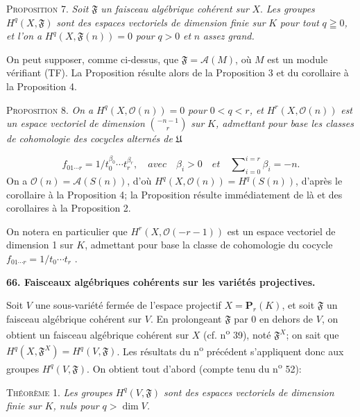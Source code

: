 \textsc{Proposition} 7. \textit{Soit} $\mathfrak{F}$ \textit{un faisceau algébrique cohérent sur} $X$. \textit{Les groupes} $H^q(X, \mathfrak{F})$ \textit{sont des espaces vectoriels de dimension finie sur} $K$ \textit{pour tout} $q \geqq 0$\textit{, et l'on a} $H^q(X, \mathfrak{F}(n)) = 0$ \textit{pour} $q > 0$ \textit{et} $n$ \textit{assez grand.}

On peut supposer, comme ci-dessus, que $\mathfrak{F} = \mathcal{A}(M)$, où $M$ est un module vérifiant (TF). La Proposition résulte alors de la Proposition 3 et du corollaire à la Proposition 4.

\textsc{Proposition} 8. \textit{On a} $H^q(X, \mathcal{O}(n)) = 0$ \textit{pour} $0 < q < r$\textit{, et} $H^r(X, \mathcal{O}(n))$ \textit{est un espace vectoriel de dimension} $\binom{-n-1}{r}$ \textit{sur} $K$\textit{, admettant pour base les classes}
\textit{de cohomologie des cocycles alternés de} $\mathfrak{U}$

\begin{equation*}
f_{01\cdots r} = 1/t_0^{\beta_0} \cdots t_r^{\beta_r}, \quad \mathit{avec} \quad \beta_i > 0 \quad \mathit{et} \quad \sum\nolimits_{i=0}^{i=r} \beta_i = -n.
\end{equation*}
On a $\mathcal{O}(n) = \mathcal{A}(S(n))$, d'où $H^q(X, \mathcal{O}(n)) = H^q(S(n))$, d'après le corollaire à la Proposition 4; la Proposition résulte immédiatement de là et des corollaires à la Proposition 2.

On notera en particulier que $H^r(X, \mathcal{O}(-r - 1))$ est un espace vectoriel de dimension 1 sur $K$, admettant pour base la classe de cohomologie du cocycle $f_{01\cdots r} = 1/t_0 \cdots t_r$ .


\textbf{66. Faisceaux algébriques cohérents sur les variétés projectives.}

Soit $V$ une sous-variété fermée de l'espace projectif $X = \mathbf{P}_r(K)$, et soit $\mathfrak{F}$ un faisceau algébrique cohérent sur $V$. En prolongeant $\mathfrak{F}$ par 0 en dehors de $V$, on obtient un faisceau algébrique cohérent sur $X$ (cf. n\textsuperscript{o} 39), noté $\mathfrak{F}^X$; on sait que $H^q(X, \mathfrak{F}^X) = H^q(V, \mathfrak{F})$. Les résultats du n\textsuperscript{o} précédent s'appliquent donc aux groupes $H^q(V, \mathfrak{F})$. On obtient tout d'abord (compte tenu du n\textsuperscript{o} 52):

\textsc{Théorème} 1. \textit{Les groupes $H^q(V, \mathfrak{F})$ sont des espaces vectoriels de dimension finie sur $K$, nuls pour $q > \dim V$.}

